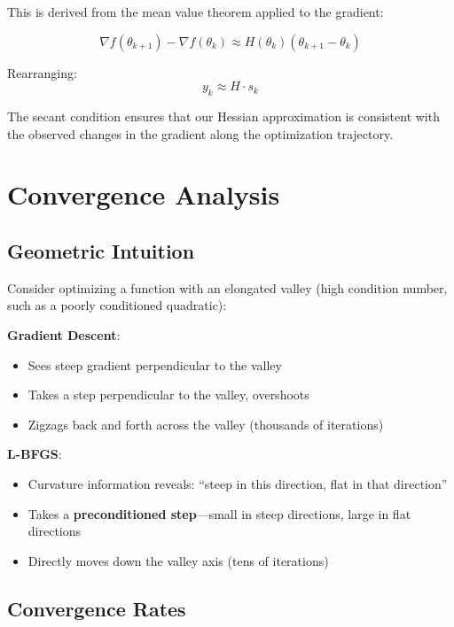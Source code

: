 \documentclass[11pt, a4paper, oneside]{article}
\begin{document}
This is derived from the mean value theorem applied to the gradient:

\begin{equation}
\nabla f(\theta_{k+1}) - \nabla f(\theta_k) \approx H(\theta_k)(\theta_{k+1} - \theta_k)
\end{equation}

Rearranging:
\begin{equation}
y_k \approx H \cdot s_k
\end{equation}

The secant condition ensures that our Hessian approximation is consistent with the observed changes in the gradient along the optimization trajectory.

\section{Convergence Analysis}

\subsection{Geometric Intuition}

Consider optimizing a function with an elongated valley (high condition number, such as a poorly conditioned quadratic):

\textbf{Gradient Descent}:
\begin{itemize}
    \item Sees steep gradient perpendicular to the valley
    \item Takes a step perpendicular to the valley, overshoots
    \item Zigzags back and forth across the valley (thousands of iterations)
\end{itemize}

\textbf{L-BFGS}:
\begin{itemize}
    \item Curvature information reveals: ``steep in this direction, flat in that direction''
    \item Takes a \textbf{preconditioned step}---small in steep directions, large in flat directions
    \item Directly moves down the valley axis (tens of iterations)
\end{itemize}

\subsection{Convergence Rates}
\end{document}
